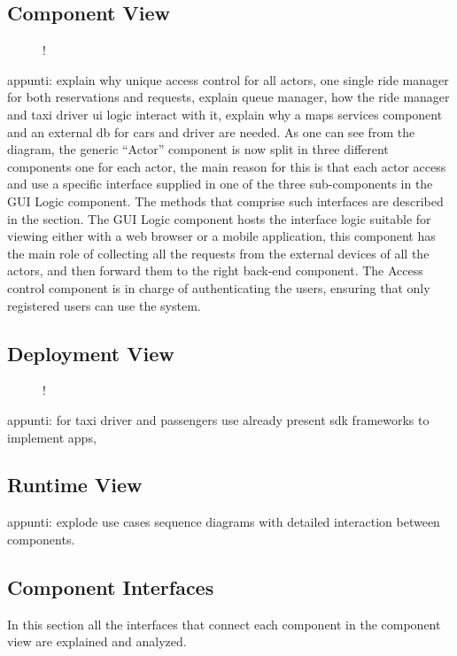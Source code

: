\subsection{Component View}
\label{sec:component-view}
\begin{figure}[H]
	\centering
	\resizebox{6in}
	{!}{}
\end{figure}
appunti: explain why unique access control for all actors, one single ride manager for both reservations and requests, explain queue manager, how the ride manager and taxi driver ui logic interact with it, explain why a maps services component and an external db for cars and driver are needed. \newline
As one can see from the diagram, the generic ``Actor'' component is now split in three different components one for each actor, the main reason for this is that each actor access and use a specific interface supplied in one of the three sub-components in the GUI Logic component. The methods that comprise such interfaces are described in the  section. \newline
The GUI Logic component hosts the interface logic suitable for viewing either with a web browser or a mobile application, this component has the main role of collecting all the requests from the external devices of all the actors, and then forward them to the right back-end component. \newline
The Access control component is in charge of authenticating the users, ensuring that only registered users can use the system.
\subsection{Deployment View}
\begin{figure}[H]
	\centering
	\resizebox{6in}
	{!}{}
\end{figure}
appunti: for taxi driver and passengers use already present sdk frameworks to implement apps,
\subsection{Runtime View}
appunti: explode use cases sequence diagrams with detailed interaction between components.
\subsection{Component Interfaces}
In this section all the interfaces that connect each component in the component view are explained and analyzed.
